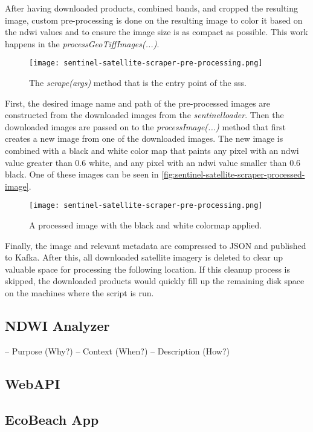 After having downloaded products, combined bands, and cropped the resulting image, custom pre-processing is done on the resulting image to color it based on the \acrshort{ndwi} values and to ensure the image size is as compact as possible. This work happens in the \emph{processGeoTiffImages(...)}.

\begin{figure}[h!]
    \centering
    \texttt{[image: sentinel-satellite-scraper-pre-processing.png]}
    \caption{The \emph{scrape(args)} method that is the entry point of the \acrshort{sss}.}
    \label{fig:sentinel-satellite-scraper-pre-processing}
\end{figure}

First, the desired image name and path of the pre-processed images are constructed from the downloaded images from the \emph{sentinelloader}. Then the downloaded images are passed on to the \emph{processImage(...)} method that first creates a new image from one of the downloaded images. The new image is combined with a black and white color map that paints any pixel with an \acrshort{ndwi} value greater than 0.6 white, and any pixel with an \acrshort{ndwi} value smaller than 0.6 black. One of these images can be seen in \autoref{fig:sentinel-satellite-scraper-processed-image}.

\begin{figure}[h!]
    \centering
    \texttt{[image: sentinel-satellite-scraper-pre-processing.png]}
    \caption{A processed image with the black and white colormap applied.}
    \label{fig:sentinel-satellite-scraper-processed-image}
\end{figure}

Finally, the image and relevant metadata are compressed to JSON and published to Kafka. After this, all downloaded satellite imagery is deleted to clear up valuable space for processing the following location. If this cleanup process is skipped, the downloaded products would quickly fill up the remaining disk space on the machines where the script is run.




\subsection{NDWI Analyzer}\label{subsec:ndwi-analyzer}

– Purpose (Why?)
– Context (When?)
– Description (How?)

\subsection{WebAPI}

\subsection{EcoBeach App}\label{subsec:ecobeach-app}





